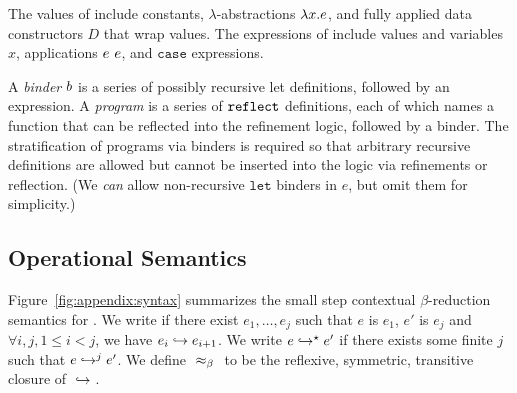 %


%
The values of \corelan include
constants, $\lambda$-abstractions
$\efun{x}{\typ}{e}$, and fully
applied data constructors $D$
that wrap values.
%
The expressions of \corelan
include values and variables $x$,
applications $\eapp{e}{e}$, and
$\mathtt{case}$ expressions.

%
A \emph{binder} $\bd$ is a series of possibly recursive
let definitions, followed by an expression.
%
A \emph{program} \prog is a series of $\erefname$
definitions, each of which names a function
that can be reflected into the refinement
logic, followed by a binder.
%
The stratification of programs via binders
is required so that arbitrary recursive definitions
are allowed but cannot be inserted into the logic
via refinements or reflection.
%
(We \emph{can} allow non-recursive $\mathtt{let}$
binders in $e$, but omit them for simplicity.)

\subsection{Operational Semantics}

Figure~\ref{fig:appendix:syntax} summarizes the small
step contextual $\beta$-reduction semantics for
\corelan.
%
%
We write  if there exist
$e_1,\ldots,e_j$ such that $e$ is $e_1$,
$e'$ is $e_j$ and $\forall i,j, 1 \leq i < j$,
we have $\evals{e_i}{e_{i+1}}$.
%
We write $\evalsto{e}{e'}$ if there exists
some finite $j$ such that $\evalj{e}{e'}{j}$.
%
We define $\betaeq{}{}$ to be the reflexive,
symmetric, transitive closure of $\evals{}{}$.

